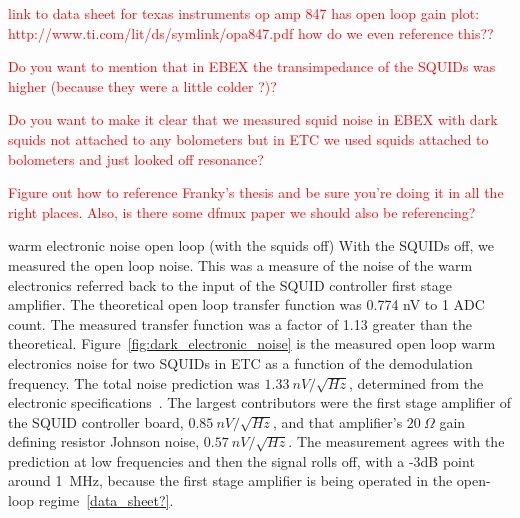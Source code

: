 \textcolor{red}{link to data sheet for texas instruments op amp 847 has open loop gain plot: http://www.ti.com/lit/ds/symlink/opa847.pdf    how do we even reference this??}

\textcolor{red}{Do you want to mention that in EBEX the transimpedance of the SQUIDs was higher (because they were a little colder ?)?}

\textcolor{red}{Do you want to make it clear that we measured squid noise in EBEX with dark squids not attached to any bolometers but in ETC we used squids attached to bolometers and just looked off resonance?}

\textcolor{red}{Figure out how to reference Franky's thesis and be sure you're doing it in all the right places. Also, is there some dfmux paper we should also be referencing?}

warm electronic noise open loop (with the squids off)
With the \ac{SQUID}s off, we measured the open loop noise.
This was a measure of the noise of the warm electronics referred back to the input of the \ac{SQUID} controller first stage amplifier. 
The theoretical open loop transfer function was 0.774 nV to 1 \ac{ADC} count. 
The measured transfer function was a factor of 1.13 greater than the theoretical. 
Figure~\ref{fig:dark_electronic_noise} is the measured open loop warm electronics noise for two \ac{SQUID}s in \ac{ETC} as a function of the demodulation frequency. 
The total noise prediction was $1.33~nV/\sqrt{Hz}$, determined from the electronic specifications~\cite{Francois2012}. 
The largest contributors were the first stage amplifier of the \ac{SQUID} controller board, $0.85~nV/\sqrt{Hz}$, and that amplifier's $20~\Omega$ gain defining resistor Johnson noise, $0.57~nV/\sqrt{Hz}$. 
The measurement agrees with the prediction at low frequencies and then the signal rolls off, with a -3dB point around 1~MHz, because the first stage amplifier is being operated in the open-loop regime~\ref{data_sheet?}.  


